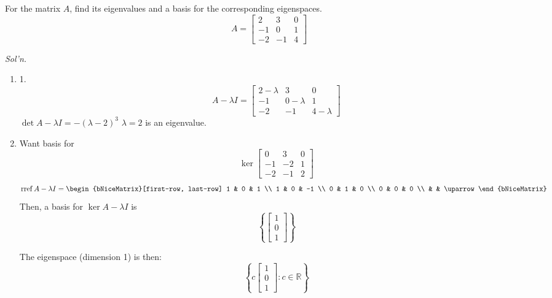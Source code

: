 \documentclass[../main.tex]{subfiles}
\begin{document}
\begin{example}
    For the matrix \( A \), find its eigenvalues and a basis for the corresponding eigenspaces.
    \[ A = \begin{bmatrix}
        2 & 3 & 0 \\
        -1 & 0 & 1 \\
        -2 & -1 & 4
    \end{bmatrix} \]

    \textit{Sol'n.}
    \begin{enumerate}
        \item 1. \[ A - \lambda I = \begin{bmatrix}
            2 - \lambda & 3 & 0 \\
            -1 & 0 - \lambda & 1 \\
            -2 & -1 & 4 - \lambda
        \end{bmatrix} \]
        \( \det A - \lambda I = -(\lambda-2)^3  \)
        \( \lambda = 2 \) is an eigenvalue.

        \item Want basis for \[ \ker \begin{bmatrix}
            0 & 3 & 0 \\
            -1 & -2 & 1 \\
            -2 & -1 & 2
        \end{bmatrix} \]
        \[ \rref A - \lambda I = \begin{bNiceMatrix}[first-row, last-row]
            1 & 0 & 1 \\
            1 & 0 & -1 \\
            0 & 1 & 0 \\
            0 & 0 & 0 \\
            & & \uparrow
        \end{bNiceMatrix} \]
        Then, a basis for  \( \ker A - \lambda I \) is
        \[ \left\{ \begin{bmatrix}
            1 \\ 0 \\ 1
        \end{bmatrix} \right\} \]

        The eigenspace (dimension 1) is then:
        \[ \left\{ c \begin{bmatrix}
            1 \\ 0 \\ 1
        \end{bmatrix} : c \in \mathbb{R} \right\} \]
    \end{enumerate}
\end{example}
\end{document}
